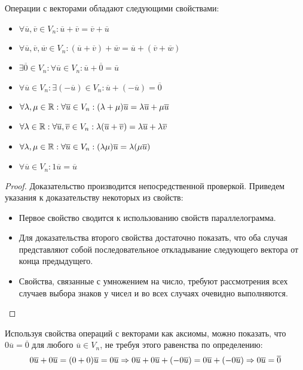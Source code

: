 \begin{proposition}
	Операции с векторами обладают следующими свойствами:
	\begin{itemize}
		\item $\forall \overline{u}, \overline{v} \in V_n: \overline{u} + \overline{v} = \overline{v} + \overline{u}$
		\item $\forall \overline{u}, \overline{v}, \overline{w} \in V_n: (\overline{u} + \overline{v}) + \overline{w} = \overline{u} + (\overline{v} + \overline{w})$
		\item $\exists \overline{0} \in V_n: \forall \overline{u} \in V_n: \overline{u} + \overline{0} = \overline{u}$
		\item $\forall \overline{u} \in V_n: \exists (-\overline{u}) \in V_n:  \overline{u} + (-\overline{u}) = \overline{0}$
		\item $\forall \lambda, \mu \in \mathbb{R}: \forall \overline{u} \in V_n: (\lambda + \mu)\overline{u} = \lambda \overline{u} + \mu \overline{u}$
		\item $\forall \lambda \in \mathbb{R}:  \forall \overline{u}, \overline{v} \in V_n: \lambda(\overline{u} + \overline{v}) = \lambda \overline{u} + \lambda \overline{v}$
		\item $\forall \lambda, \mu \in \mathbb{R}:  \forall \overline{u} \in V_n: (\lambda \mu)\overline{u} = \lambda(\mu \overline{u})$
		\item $\forall \overline{u} \in V_n: 1\overline{u} = \overline{u}$
	\end{itemize}
\end{proposition}

\begin{proof}
	Доказательство производится непосредственной проверкой. Приведем указания к доказательству некоторых из свойств:
	\begin{itemize}
		\item Первое свойство сводится к использованию свойств параллелограмма.
		\item Для доказательства второго свойства достаточно показать, что оба случая представляют собой последовательное откладывание следующего вектора от конца предыдущего.
		\item Свойства, связанные с умножением на число, требуют рассмотрения всех случаев выбора знаков у чисел и во всех случаях очевидно выполняются.\qedhere
	\end{itemize}
\end{proof}

\begin{note}
	Используя свойства операций с векторами как аксиомы, можно показать, что $0\overline{u} = \overline{0}$ для любого $\overline{u} \in V_n$, не требуя этого равенства по определению:
	\[0\overline{u} + 0\overline{u} = (0 + 0)\overline{u} = 0\overline{u}
	\Rightarrow 0\overline{u} + 0\overline{u} + (-0\overline{u}) = 0\overline{u} + (-0\overline{u})
	\Rightarrow 0\overline{u} = \overline{0}\]
\end{note}

